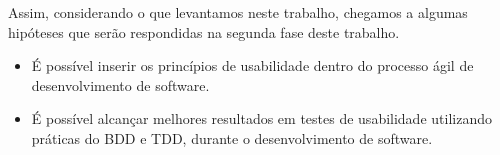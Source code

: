 Assim, considerando o que levantamos neste trabalho, chegamos a algumas hipóteses que serão respondidas na segunda fase deste trabalho.

\begin{itemize}
\item É possível inserir os princípios de usabilidade dentro do processo ágil de desenvolvimento de software.
\item É possível alcançar melhores resultados em testes de usabilidade utilizando práticas do BDD e TDD, durante o desenvolvimento de software.
\end{itemize}

\begin{comment}
Segundo ~\citeonline{siegel2010} para ser defensor de UX você não precisa criar  \textit{mockups} perfeitos no Inkscape \footnote{Inkscape - Aplicativo de edição de imagens} e nem ter um bom conhecimento de HCI. Para ele tudo que você precisa é de amor por um projeto open source e as pessoas que a usam, sendo paciente, persistente e persuasivo.É útil ter alguém com conhecimento em experiência do usuário mas muitas vezes é desnecessário. É melhor para um projeto open source ter um defensor UX novato do que nenhum.

	Os defensores em usabilidade não precisam ser desenvolvedores e nem sequer precisa ser um especialista em usabilidade. É preciso tempo, energia e diposição para obter uma boa experiência do usuário. O defensor de UX pode filtrar e priorizar erros UX, pesquisar problemas de design e realizar testes com os usuário ~\cite{day2010}.

	Muitos desenvolvedores de software livre já sabem da importância da usabilidade, mas não sabem como melhorá-la. ~\citeonline{andreasen2006} diz que um grande problema de se trabalhar com eles é a falta de confiança e por isso é preciso comunicar abertamente suas descobertas e métodos. 

	Gravação de testes de usabilidade ou entrevistas para ter citações de usuários para apresentação é uma prática comum em agências de usabilidade no qual é necessário assinar um formulário de concessão de uso da imagem. Para ~\citeonline{borchardt2011} em projetos de software livre independentes, as gravações de participantes são bastante inúteis, pois criam muito trabalho apenas para apresentação, além de que rever as gravações levaria o dobro de tempo.

	No desenvolvimento de software livre uma das vantagens na apresentação dos resultados de forma rápida e sem a necessidade de elaborar um relatório um uma apresentação. A comunicação pode ser feita diretamente com os desenvolvedores sobre os problemas encontrados e fazer iterações rápidas com base em sugestões ~\cite{borchardt2011}.
\end{comment}

